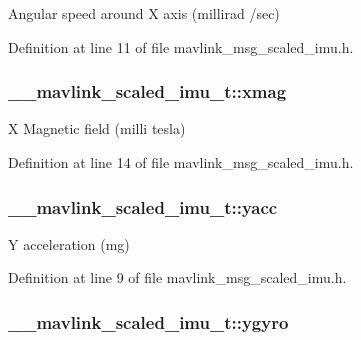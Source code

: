 Angular speed around X axis (millirad /sec) 



Definition at line 11 of file mavlink\-\_\-msg\-\_\-scaled\-\_\-imu.\-h.

\hypertarget{struct____mavlink__scaled__imu__t_a600200625259b8ddc5702b2116e9d619}{
\subsubsection[{xmag}]{ \-\_\-\-\_\-mavlink\-\_\-scaled\-\_\-imu\-\_\-t\-::xmag}}\label{struct____mavlink__scaled__imu__t_a600200625259b8ddc5702b2116e9d619}


X Magnetic field (milli tesla) 



Definition at line 14 of file mavlink\-\_\-msg\-\_\-scaled\-\_\-imu.\-h.

\hypertarget{struct____mavlink__scaled__imu__t_aa3c8baf85a0087a26c7be8d2203744f8}{
\subsubsection[{yacc}]{ \-\_\-\-\_\-mavlink\-\_\-scaled\-\_\-imu\-\_\-t\-::yacc}}\label{struct____mavlink__scaled__imu__t_aa3c8baf85a0087a26c7be8d2203744f8}


Y acceleration (mg) 



Definition at line 9 of file mavlink\-\_\-msg\-\_\-scaled\-\_\-imu.\-h.

\hypertarget{struct____mavlink__scaled__imu__t_a357d16590de8334390c67ddd5d3139b3}{
\subsubsection[{ygyro}]{ \-\_\-\-\_\-mavlink\-\_\-scaled\-\_\-imu\-\_\-t\-::ygyro}}\label{struct____mavlink__scaled__imu__t_a357d16590de8334390c67ddd5d3139b3}


